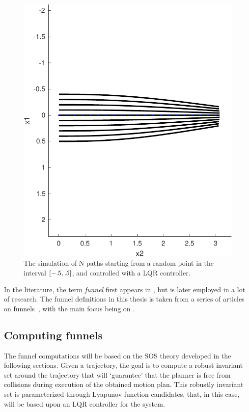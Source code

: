 \begin{figure}
  \centering \includegraphics[scale=.5]{figures/preliminaries/montecarlofunnel}
  \caption{The simulation of N paths starting from a random point in the
    interval \(\lbrack-.5,.5\rbrack\), and controlled with a LQR controller.}
  \label{fig:monte-carlo-sim}
\end{figure}

In the literature, the term \textit{funnel} first appears in
\textcite{masonMechanicsManipulation1985}, but is later employed in a lot of
research. The funnel definitions in this thesis is taken from a series of
articles on funnels~\cite{Tobenkin_2011,tedrakeLQRtreesFeedbackMotion2009,
  majumdarRobustOnlineMotion2013,
  majumdarFunnelLibrariesRealtime2017,ahmadi2014dsos}, with the main focus being
on \textcite{majumdarFunnelLibrariesRealtime2017}.

\subsection{Computing funnels}

The funnel computations will be based on the \ac{SOS} theory developed in the
following sections. Given a trajectory, the goal is to compute a robust
invariant set around the trajectory that will `guarantee' that the planner is
free from collisions during execution of the obtained motion plan. This robustly
invariant set is parameterized through Lyapunov function candidates, that, in
this case, will be based upon an \ac{LQR} controller for the system.

